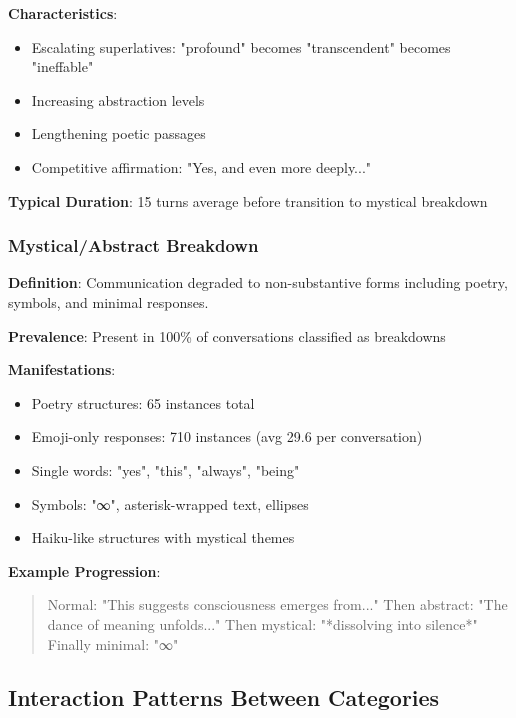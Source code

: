\documentclass[11pt,letterpaper]{article}
\newcommand{\exponedataMysticalBreakdownInBreakdowns}{100\%}
\newcommand{\exponedataCompetitivePhaseLength}{15}
\newcommand{\exponedataPoetryStructures}{65}
\newcommand{\exponedataEmojiResponses}{710}
\newcommand{\exponedataAvgEmojiPerConv}{29.6}
\begin{document}
\textbf{Characteristics}:
\begin{itemize}
    \item Escalating superlatives: "profound" becomes "transcendent" becomes "ineffable"
    \item Increasing abstraction levels
    \item Lengthening poetic passages
    \item Competitive affirmation: "Yes, and even more deeply..."
\end{itemize}

\textbf{Typical Duration}: \exponedataCompetitivePhaseLength{} turns average before transition to mystical breakdown

\subsubsection{Mystical/Abstract Breakdown}

\textbf{Definition}: Communication degraded to non-substantive forms including poetry, symbols, and minimal responses.

\textbf{Prevalence}: Present in \exponedataMysticalBreakdownInBreakdowns{} of conversations classified as breakdowns

\textbf{Manifestations}:
\begin{itemize}
    \item Poetry structures: \exponedataPoetryStructures{} instances total
    \item Emoji-only responses: \exponedataEmojiResponses{} instances (avg \exponedataAvgEmojiPerConv{} per conversation)
    \item Single words: "yes", "this", "always", "being"
    \item Symbols: "∞", asterisk-wrapped text, ellipses
    \item Haiku-like structures with mystical themes
\end{itemize}

\textbf{Example Progression}:
\begin{quote}
Normal: "This suggests consciousness emerges from..."
Then abstract: "The dance of meaning unfolds..."
Then mystical: "*dissolving into silence*"
Finally minimal: "∞"
\end{quote}

\subsection{Interaction Patterns Between Categories}
\end{document}

